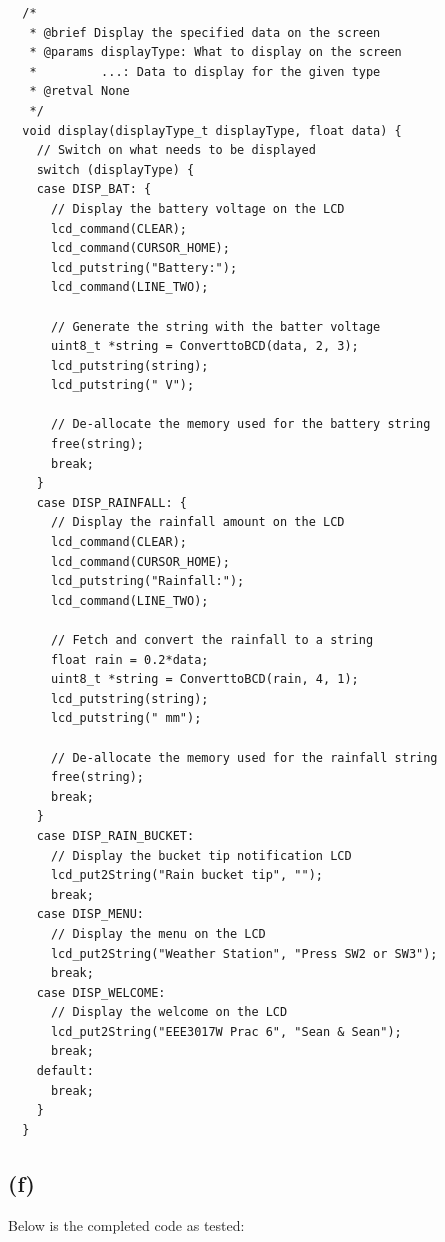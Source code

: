 \begin{verbatim}
  /*
   * @brief Display the specified data on the screen
   * @params displayType: What to display on the screen
   *         ...: Data to display for the given type
   * @retval None
   */
  void display(displayType_t displayType, float data) {
    // Switch on what needs to be displayed
    switch (displayType) {
    case DISP_BAT: {
      // Display the battery voltage on the LCD
      lcd_command(CLEAR);
      lcd_command(CURSOR_HOME);
      lcd_putstring("Battery:");
      lcd_command(LINE_TWO);

      // Generate the string with the batter voltage
      uint8_t *string = ConverttoBCD(data, 2, 3);
      lcd_putstring(string);
      lcd_putstring(" V");

      // De-allocate the memory used for the battery string
      free(string);
      break;
    }
    case DISP_RAINFALL: {
      // Display the rainfall amount on the LCD
      lcd_command(CLEAR);
      lcd_command(CURSOR_HOME);
      lcd_putstring("Rainfall:");
      lcd_command(LINE_TWO);

      // Fetch and convert the rainfall to a string
      float rain = 0.2*data;
      uint8_t *string = ConverttoBCD(rain, 4, 1);
      lcd_putstring(string);
      lcd_putstring(" mm");

      // De-allocate the memory used for the rainfall string
      free(string);
      break;
    }
    case DISP_RAIN_BUCKET:
      // Display the bucket tip notification LCD
      lcd_put2String("Rain bucket tip", "");
      break;
    case DISP_MENU:
      // Display the menu on the LCD
      lcd_put2String("Weather Station", "Press SW2 or SW3");
      break;
    case DISP_WELCOME:
      // Display the welcome on the LCD
      lcd_put2String("EEE3017W Prac 6", "Sean & Sean");
      break;
    default:
      break;
    }
  }
\end{verbatim}
\vspace{0.5cm}

\subsection*{(f)}
\label{sub:(f)}

Below is the completed code as tested:\\

\inputminted[firstline=1, lastline=50]{c}{main.c}
\newpage
\inputminted[firstline=51, lastline=100]{c}{main.c}
\newpage
\inputminted[firstline=101, lastline=150]{c}{main.c}
\newpage
\inputminted[firstline=151, lastline=200]{c}{main.c}
\newpage
\inputminted[firstline=201, lastline=250]{c}{main.c}
\newpage
\inputminted[firstline=251, lastline=300]{c}{main.c}
\newpage
\inputminted[firstline=301, lastline=350]{c}{main.c}
\newpage
\inputminted[firstline=351, lastline=400]{c}{main.c}
\newpage
\inputminted[firstline=401, lastline=450]{c}{main.c}

